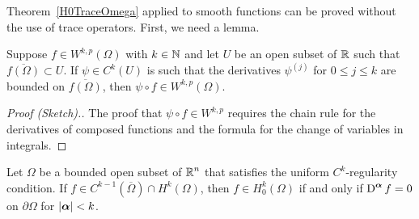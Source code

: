 Theorem~\ref{H0TraceOmega} applied to smooth functions can be proved
without the use of trace operators.  First, we need a lemma.

\begin{lemma} \label{sob_comp_DF}
Suppose $\displaystyle f \in W^{k,p}(\Omega)$ with $k\in \mathbb{N}$ and let
$U$ be an open subset of $\mathbb{R}$ such that
$\displaystyle \overline{ f(\Omega)} \subset U$.  If
$\psi \in C^k(U)$ is such that the derivatives $\displaystyle \psi^{(j)}$ for
$0\leq j \leq k$ are bounded on $\displaystyle \overline{ f(\Omega)}$,
then $\displaystyle \psi \circ f \in W^{k,p}(\Omega)$.
\end{lemma}

\begin{proof}[Proof (Sketch).]
The proof that $\displaystyle \psi \circ f \in W^{k,p}$ requires the
chain rule for the derivatives of composed functions and the formula
for the change of variables in integrals.
\end{proof}

\begin{prop} \label{sob_w0_trad2}
Let $\Omega$ be a bounded open subset of
$\displaystyle \mathbb{R}^n$ that satisfies the uniform
$\displaystyle C^k$-regularity condition.  If
$\displaystyle f \in C^{k-1}\left(\overline{\Omega}\right) \cap H^k(\Omega)$,
then
$\displaystyle f \in H^k_0(\Omega)$ if and only if
$\displaystyle \operatorname{D}^{{\bm{\alpha}}} f =0$ on $\partial \Omega$ for
$|{\bm{\alpha}}|<k$.
\end{prop}

